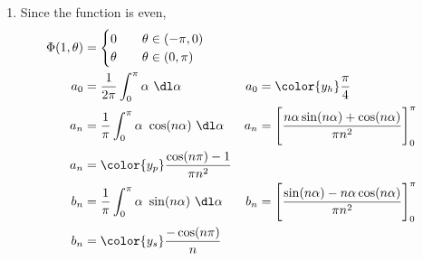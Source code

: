 \begin{enumerate}
    \item Since the function is even,
          \begin{align}
              \Phi(1, \theta) & = \begin{cases}
                                      0      & \quad \theta \in (-\pi, 0) \\
                                      \theta & \quad \theta \in (0, \pi)  \\
                                  \end{cases}        \\
              a_0             & = \frac{1}{2\pi} \int_{0}^{\pi} \alpha
              \ \dl \alpha    &
              a_0             & = \color{y_h} \frac{\pi}{4}                  \\
              a_n             & = \frac{1}{\pi} \int_{0}^{\pi} \alpha
              \ \cos(n\alpha)\ \dl \alpha
                              &
              a_n             & = \Bigg[ \frac{n\alpha\sin(n\alpha)
              + \cos(n\alpha)}{\pi n^2} \Bigg]_0^\pi                         \\
              a_n             & = \color{y_p} \frac{\cos(n\pi) - 1}{\pi n^2} \\
              b_n             & = \frac{1}{\pi} \int_{0}^{\pi} \alpha
              \ \sin(n\alpha)\ \dl \alpha
                              &
              b_n             & = \Bigg[ \frac{\sin(n\alpha)
              - n\alpha \cos(n\alpha)}{\pi n^2} \Bigg]_0^\pi                 \\
              b_n             & = \color{y_s} \frac{-\cos(n\pi)}{n}
          \end{align}


\end{enumerate}
